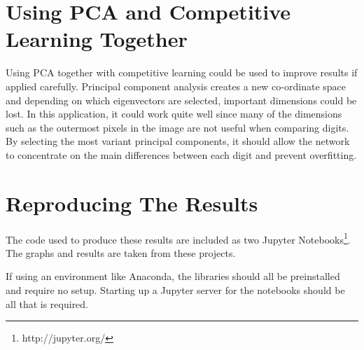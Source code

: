 \documentclass[11pt,journal,transmag,final]{IEEEtran}
\begin{document}
\section{Using PCA and Competitive Learning Together}

Using PCA together with competitive learning could be used to improve results if applied carefully. Principal component analysis creates a new co-ordinate space and depending on which eigenvectors are selected, important dimensions could be lost. In this application, it could work quite well since many of the dimensions such as the outermost pixels in the image are not useful when comparing digits. By selecting the most variant principal components, it should allow the network to concentrate on the main differences between each digit and prevent overfitting.

\section{Reproducing The Results}

The code used to produce these results are included as two Jupyter Notebooks\footnote{http://jupyter.org/}. The graphs and results are taken from these projects.

If using an environment like Anaconda, the libraries should all be preinstalled and require no setup. Starting up a Jupyter server for the notebooks should be all that is required.
\end{document}
